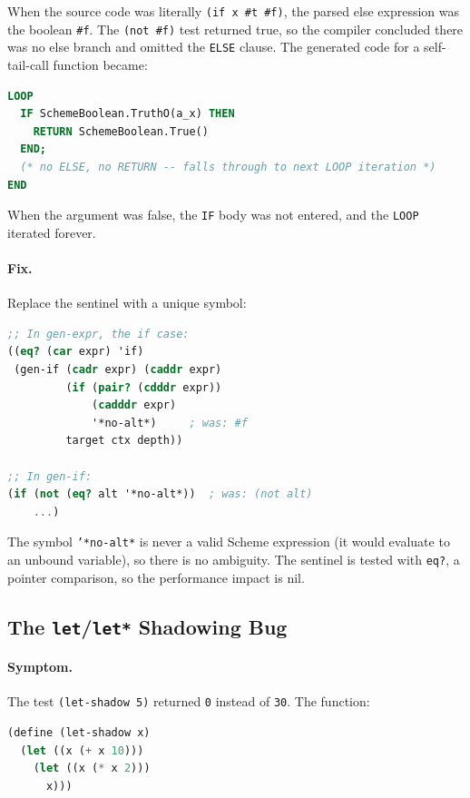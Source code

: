 \documentclass[12pt]{report}
\begin{document}
When the source code was literally \texttt{(if x \#t \#f)}, the
parsed else expression was the boolean \texttt{\#f}.  The
\texttt{(not \#f)} test returned true, so the compiler concluded
there was no else branch and omitted the \texttt{ELSE} clause.
The generated code for a self-tail-call function became:

\begin{lstlisting}[language=Modula3]
LOOP
  IF SchemeBoolean.TruthO(a_x) THEN
    RETURN SchemeBoolean.True()
  END;
  (* no ELSE, no RETURN -- falls through to next LOOP iteration *)
END
\end{lstlisting}

When the argument was false, the \texttt{IF} body was not entered,
and the \texttt{LOOP} iterated forever.

\paragraph{Fix.}
Replace the sentinel with a unique symbol:

\begin{lstlisting}[language=Scheme]
;; In gen-expr, the if case:
((eq? (car expr) 'if)
 (gen-if (cadr expr) (caddr expr)
         (if (pair? (cdddr expr))
             (cadddr expr)
             '*no-alt*)     ; was: #f
         target ctx depth))

;; In gen-if:
(if (not (eq? alt '*no-alt*))  ; was: (not alt)
    ...)
\end{lstlisting}

The symbol \texttt{'*no-alt*} is never a valid Scheme expression (it
would evaluate to an unbound variable), so there is no ambiguity.
The sentinel is tested with \texttt{eq?}, a pointer comparison, so
the performance impact is nil.

\subsection{The \texttt{let}/\texttt{let*} Shadowing Bug}
\label{sec:bug-let}

\paragraph{Symptom.}
The test \texttt{(let-shadow 5)} returned \texttt{0} instead of
\texttt{30}.  The function:

\begin{lstlisting}[language=Scheme]
(define (let-shadow x)
  (let ((x (+ x 10)))
    (let ((x (* x 2)))
      x)))
\end{lstlisting}
\end{document}
